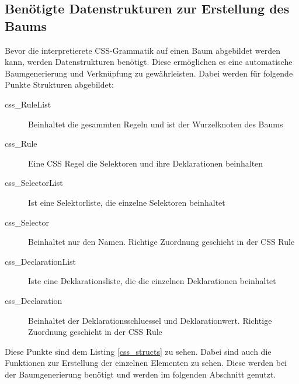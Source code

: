 \subsection{Benötigte Datenstrukturen zur Erstellung des Baums}
Bevor die interpretierete CSS-Grammatik auf einen Baum abgebildet werden kann, werden Datenstrukturen benötigt. Diese ermöglichen es eine automatische Baumgenerierung und Verknüpfung zu gewährleisten. Dabei werden für folgende Punkte Strukturen abgebildet:
\begin{description}
    \item[css\_RuleList] Beinhaltet die gesammten Regeln und ist der Wurzelknoten des Baums 

    \item[css\_Rule] Eine CSS Regel die Selektoren und ihre Deklarationen beinhalten 

    \item[css\_SelectorList] Ist eine Selektorliste, die einzelne Selektoren beinhaltet 
    
    \item[css\_Selector] Beinhaltet nur den Namen. Richtige Zuordnung geschieht in der CSS Rule

    \item[css\_DeclarationList] Iste eine Deklarationsliste, die die einzelnen Deklarationen beinhaltet 

    \item[css\_Declaration] Beinhaltet der Deklarationsschluessel und Deklarationwert. Richtige Zuordnung geschieht in der CSS Rule 

\end{description}

Diese Punkte sind dem Listing \ref{css_structs} zu sehen. Dabei sind auch die Funktionen zur Erstellung der einzelnen Elementen zu sehen. Diese werden bei der Baumgenerierung benötigt und werden im folgenden Abschnitt genutzt.

